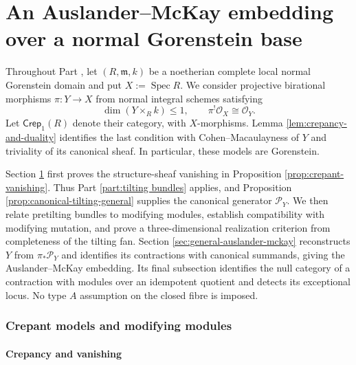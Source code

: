 \documentclass[a4paper,reqno]{amsart}
\def\O{\mathcal{O}}
\def\P{\mathcal{P}}
\def\m{\mathfrak{m}}
\DeclareMathOperator{\Spec}{Spec}
\theoremstyle{definition}
\begin{document}
\part{An Auslander--McKay embedding over a normal Gorenstein base}\label{part:auslander-mckay}

Throughout Part \ref{part:auslander-mckay}, let $(R,\m,k)$ be a noetherian complete local normal Gorenstein domain and put $X:=\Spec R$. We consider projective birational morphisms $\pi\colon Y\to X$ from normal integral schemes satisfying
\begin{equation}\label{eq:crepant-model-hypotheses}
\dim(Y\times_Rk)\le1,\qquad
\pi^!\O_X\cong\O_Y.
\end{equation}
Let $\mathsf{Crep}_1(R)$ denote their category, with $X$-morphisms. Lemma \ref{lem:crepancy-and-duality} identifies the last condition with Cohen--Macaulayness of $Y$ and triviality of its canonical sheaf. In particular, these models are Gorenstein.

Section \ref{sec:general-reflexive-pushforward} first proves the structure-sheaf vanishing in Proposition \ref{prop:crepant-vanishing}. Thus Part \ref{part:tilting bundles} applies, and Proposition \ref{prop:canonical-tilting-general} supplies the canonical generator $\P_Y$. We then relate pretilting bundles to modifying modules, establish compatibility with modifying mutation, and prove a three-dimensional realization criterion from completeness of the tilting fan. Section \ref{sec:general-auslander-mckay} reconstructs $Y$ from $\pi_*\P_Y$ and identifies its contractions with canonical summands, giving the Auslander--McKay embedding. Its final subsection identifies the null category of a contraction with modules over an idempotent quotient and detects its exceptional locus. No type $A$ assumption on the closed fibre is imposed.

\section{Crepant models and modifying modules}\label{sec:general-reflexive-pushforward}

\subsection{Crepancy and vanishing}\label{sec:crepant-vanishing}
\end{document}
